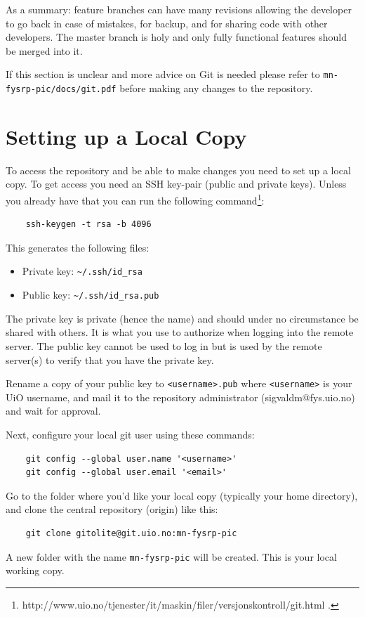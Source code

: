 \documentclass[10pt,a4paper]{article}
\begin{document}
As a summary: feature branches can have many revisions allowing the developer to go back in case of mistakes, for backup, and for sharing code with other developers. The master branch is holy and only fully functional features should be merged into it.

If this section is unclear and more advice on Git is needed please refer to \texttt{mn-fysrp-pic/docs/git.pdf} before making any changes to the repository.

\section{Setting up a Local Copy}
To access the repository and be able to make changes you need to set up a local copy. To get access you need an SSH key-pair (public and private keys). Unless you already have that you can run the following command\footnote{http://www.uio.no/tjenester/it/maskin/filer/versjonskontroll/git.html .}:

\begin{verbatim}
	ssh-keygen -t rsa -b 4096
\end{verbatim}
This generates the following files:

\begin{itemize}
	\item Private key: \verb$~/.ssh/id_rsa$
	\item Public key: \verb$~/.ssh/id_rsa.pub$
\end{itemize}
The private key is private (hence the name) and should under no circumstance be shared with others. It is what you use to authorize when logging into the remote server. The public key cannot be used to log in but is used by the remote server(s) to verify that you have the private key.

Rename a copy of your public key to \verb$<username>.pub$ where \verb$<username>$ is your UiO username, and mail it to the repository administrator (sigvaldm@fys.uio.no) and wait for approval.

Next, configure your local git user using these commands:

\begin{verbatim}
	git config --global user.name '<username>'
	git config --global user.email '<email>'
\end{verbatim}
Go to the folder where you'd like your local copy (typically your home directory), and clone the central repository (origin) like this:

\begin{verbatim}
	git clone gitolite@git.uio.no:mn-fysrp-pic
\end{verbatim}
A new folder with the name \verb$mn-fysrp-pic$ will be created. This is your local working copy.
\end{document}
